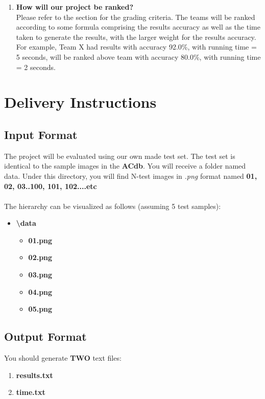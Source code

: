 \documentclass[12pt]{article}
\begin{document}
\begin{enumerate}
    \item \textbf{How will our project be ranked?}
    \\
    Please refer to the  section for the grading criteria. The teams will be ranked according to some formula comprising the results accuracy as well as the time taken to generate the results, with the larger weight for the results accuracy. For example, Team X had results with accuracy {\color{blue} 92.0\%}, with running time = {\color{blue} 5 seconds}, will be ranked above team with accuracy {\color{blue} 80.0\%}, with running time = {\color{blue} 2 seconds}.
\end{enumerate}

\newpage
\section{Delivery Instructions}
\subsection{Input Format}
The project will be evaluated using our own made test set. The test set is identical to the sample images in the \textbf{ACdb}. You will receive a folder named data. Under this directory, you will find N-test images in \textit{.png} format named \textbf{01, 02, 03..100, 101, 102....etc}
\\
\\
The hierarchy can be visualized as follows (assuming 5 test samples):
\begin{itemize}
    \item \textbf{\textbackslash data}
    \begin{itemize}
        \item \textbf{ 01.png}
        \item \textbf{ 02.png}
        \item \textbf{ 03.png}
        \item \textbf{ 04.png}
        \item \textbf{ 05.png}
    \end{itemize}
\end{itemize}

\subsection{Output Format}
You should generate \textbf{TWO} text files:
\begin{enumerate}
    \item \textbf{results.txt}
    \item \textbf{time.txt}
\end{enumerate}
\end{document}

